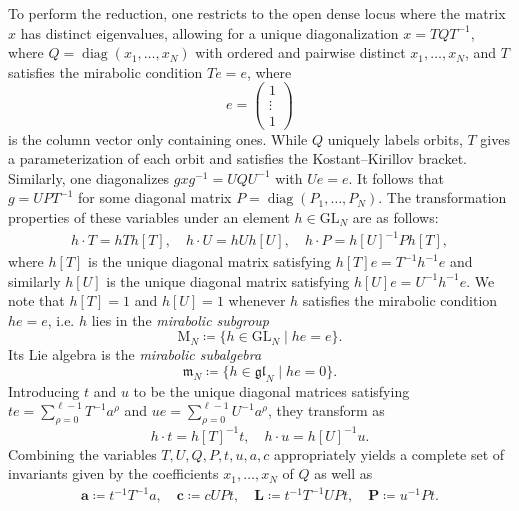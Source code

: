 To perform the reduction, one restricts to the open dense locus where the matrix $x$ has distinct eigenvalues, allowing for a unique diagonalization $x = TQT^{-1}$, where $Q = \operatorname{diag}(x_1,\dots,x_N)$ with ordered and pairwise distinct $x_1,\dots,x_N$, and $T$ satisfies the mirabolic condition $Te = e$, where
\begin{equation}
    e =
    \begin{pmatrix}
        1 \\ \vdots \\ 1
    \end{pmatrix}
\end{equation}
is the column vector only containing ones. While $Q$ uniquely labels orbits, $T$ gives a parameterization of each orbit and satisfies the Kostant--Kirillov bracket. Similarly, one diagonalizes $gxg^{-1} = UQU^{-1}$ with $Ue = e$. It follows that $g = UPT^{-1}$ for some diagonal matrix $P = \operatorname{diag}(P_1,\dots,P_N)$. The transformation properties of these variables under an element $h \in \mathrm{GL}_N$ are as follows:
\begin{align}
h \cdot T = hTh[T], \quad h \cdot U = hUh[U], \quad h \cdot P = h[U]^{-1} P h[T],
\end{align}
where $h[T]$ is the unique diagonal matrix satisfying $h[T] e = T^{-1} h^{-1} e$ and similarly $h[U]$ is the unique diagonal matrix satisfying $h[U] e = U^{-1} h^{-1} e$. We note that $h[T] = 1$ and $h[U] = 1$ whenever $h$ satisfies the mirabolic condition $he = e$, i.e. $h$ lies in the \emph{mirabolic subgroup}
\begin{equation}
\mathrm{M}_N \coloneq \{ h \in \mathrm{GL}_N \mid he = e \}.
\end{equation}
Its Lie algebra is the \emph{mirabolic subalgebra}
\begin{equation}
\mathfrak{m}_N \coloneq \{ h \in \mathfrak{gl}_N \mid he = 0 \}.
\end{equation}
Introducing $t$ and $u$ to be the unique diagonal matrices satisfying $te = \sum_{\rho=0}^{\ell-1} T^{-1} a^\rho$ and $ue = \sum_{\rho=0}^{\ell-1} U^{-1} a^\rho$, they transform as
\begin{equation}
h \cdot t = h[T]^{-1} t, \quad h \cdot u = h[U]^{-1} u.
\end{equation}
Combining the variables $T,U,Q,P,t,u,a,c$ appropriately yields a complete set of invariants given by the coefficients $x_1,\dots,x_N$ of $Q$ as well as
\begin{align}
\mathbf{a} \coloneq t^{-1} T^{-1} a, \quad \mathbf{c} \coloneq c UPt, \quad \mathbf{L} \coloneq t^{-1} T^{-1} UPt, \quad \mathbf{P} \coloneq u^{-1} P t.
\end{align}
